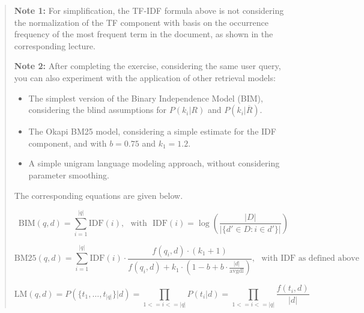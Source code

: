 \documentclass[12pt]{article}
\begin{document}
\begin{quote}
    \textbf{Note 1:} For simplification, the TF-IDF formula above is not considering the normalization of the TF component with basis on the occurrence frequency of the most frequent term in the document, as shown in the corresponding lecture.
    
    \textbf{Note 2:} After completing the exercise, considering the same user query, you can also experiment with the application of other retrieval models:
    \begin{itemize}
    \item The simplest version of the Binary Independence Model (BIM), considering the blind assumptions for $P(k_i|R)$ and $P(k_i|\overline{R})$.
    \item The Okapi BM25 model, considering a simple estimate for the IDF component, and with $b=0.75$ and $k_1=1.2$.
    \item A simple unigram language modeling approach, without considering parameter smoothing.
    \end{itemize}
    The corresponding equations are given below.
    
    \begin{center}
    \begin{equation*}
	\mathrm{BIM}(q,d) = \sum _{i=1}^{|q|} \mathrm{IDF}(i), \text{~~with~~} \mathrm{IDF}(i) = \log \left( \frac{|D|}{|\{d' \in D: i \in d'\}|} \right)
	\end{equation*}
    \end{center}
    
    \begin{center}
    \begin{equation*}
{ {\text{BM25}}(q,d)=\sum _{i=1}^{|q|}{\text{IDF}}({i})\cdot {\frac {f(q_{i},d)\cdot (k_{1}+1)}{f(q_{i},d)+k_{1}\cdot \left(1-b+b\cdot {\frac {|d|}{\text{avgdl}}}\right)}},} \text{~~with IDF as defined above}
    \end{equation*}
    \end{center}
    
    \begin{center}
    \begin{equation*}
	\mathrm{LM}(q,d) = P(\{t_1,\ldots,t_{|q|}\}|d) = \prod_{1<=i<=|q|} P(t_i|d) = \prod_{1<=i<=|q|} \frac{f(t_i,d)}{|d|}
	\end{equation*}
    \end{center}
\end{quote}
\end{document}
